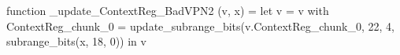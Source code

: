 function _update_ContextReg_BadVPN2 (v, x) = let v = { v with ContextReg_chunk_0 = update_subrange_bits(v.ContextReg_chunk_0, 22, 4, subrange_bits(x, 18, 0)) } in
  v

